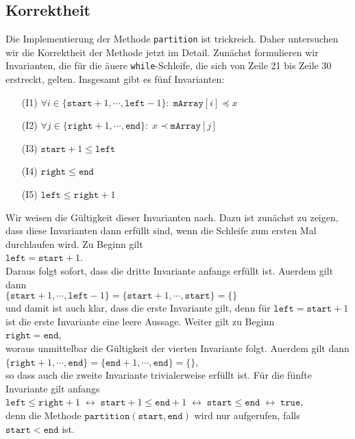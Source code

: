 \subsection{Korrektheit}
Die Implementierung der Methode \texttt{partition} ist trickreich.  Daher untersuchen wir
die Korrektheit der Methode jetzt im Detail.  Zun\"achst formulieren wir Invarianten, die
f\"ur die \"au\3ere \texttt{while}-Schleife, die sich von Zeile 21 bis Zeile 30 erstreckt,
gelten.  Insgesamt gibt es f\"unf Invarianten:
\begin{enumerate}
\item[(I1)] $\forall i \in \{ \mathtt{start}+1, \cdots, \mathtt{left} - 1 \} \colon\; \mathtt{mArray}[i] \preceq x$
\item[(I2)] $\forall j \in \{ \mathtt{right}+1, \cdots, \mathtt{end} \} \colon\; x \prec \mathtt{mArray}[j]$
\item[(I3)] $\mathtt{start}+1 \leq \mathtt{left}$ 
\item[(I4)] $\mathtt{right} \leq \mathtt{end}$ 
\item[(I5)] $\mathtt{left} \leq \mathtt{right} + 1$
\end{enumerate}
Wir weisen die G\"ultigkeit dieser Invarianten nach.  Dazu ist zun\"achst zu zeigen,
dass diese Invarianten dann erf\"ullt sind, wenn die Schleife zum ersten Mal durchlaufen wird.
Zu Beginn gilt \\[0.1cm]
\hspace*{1.3cm} $\texttt{left} = \mathtt{start} + 1$. \\[0.1cm]
Daraus folgt sofort, dass die dritte Invariante anfangs erf\"ullt ist.  Au\3erdem gilt dann \\[0.1cm]
\hspace*{1.3cm} 
$\{ \mathtt{start}+1, \cdots, \mathtt{left}-1 \} = \{ \mathtt{start}+1, \cdots, \mathtt{start} \} = \{\}$
\\[0.1cm]
und damit ist auch klar, dass die erste Invariante gilt, denn f\"ur $\mathtt{left} = \mathtt{start}+1$
ist die erste Invariante eine leere Aussage.  Weiter gilt zu Beginn \\[0.1cm]
\hspace*{1.3cm} $\mathtt{right} = \mathtt{end}$,
\\[0.1cm]
woraus unmittelbar die G\"ultigkeit der vierten Invariante folgt.  Au\3erdem gilt dann \\[0.1cm]
\hspace*{1.3cm} 
$\{ \mathtt{right}+1, \cdots, \mathtt{end} \} = \{ \mathtt{end}+1, \cdots, \mathtt{end} \} = \{\}$,
\\[0.1cm]
so dass auch die zweite Invariante trivialerweise erf\"ullt ist.  F\"ur die f\"unfte Invariante gilt anfangs
 \\[0.1cm]
\hspace*{1.3cm} 
$\mathtt{left} \leq \mathtt{right} + 1 \;\leftrightarrow\; \mathtt{start} + 1 \leq \mathtt{end} + 1 \;\leftrightarrow\;
  \mathtt{start} \leq \mathtt{end} \;\leftrightarrow\; \mathtt{true}$,
\\[0.1cm]
denn die Methode $\texttt{partition}(\texttt{start}, \texttt{end})$ wird nur aufgerufen,
falls $\mathtt{start} < \mathtt{end}$ ist.
\vspace*{0.3cm}

